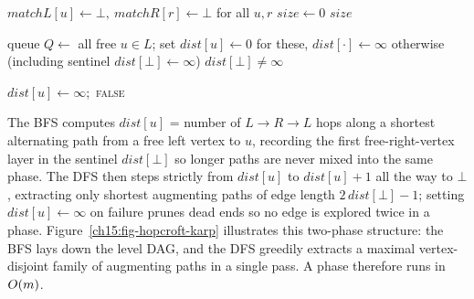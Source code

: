 \begin{algorithm}[H]
\caption{\textsc{HopcroftKarp}$(L,R,E)$}
\label{ch15:alg-hk}
\DontPrintSemicolon
$\mathit{matchL}[u]\gets\bot,\ \mathit{matchR}[r]\gets\bot$ for all $u,r$\;
$\mathit{size}\gets 0$\;
\Return $\mathit{size}$\;
\end{algorithm}

\begin{algorithm}[H]
\caption{\textsc{BFS}() -- build layers, return whether any augmenting path exists}
\label{ch15:alg-hk-bfs}
\DontPrintSemicolon
queue $Q\gets$ all free $u\in L$; set $\mathit{dist}[u]\gets 0$ for these,
$\mathit{dist}[\cdot]\gets\infty$ otherwise (including sentinel $\mathit{dist}[\bot]\gets\infty$)\;
\Return $\mathit{dist}[\bot]\neq\infty$\;
\end{algorithm}

\begin{algorithm}[H]
\caption{\textsc{DFS}$(u)$ -- extract one shortest augmenting path from $u$}
\label{ch15:alg-hk-dfs}
\DontPrintSemicolon
{}
$\mathit{dist}[u]\gets\infty$;\ \Return \textsc{false}\;
\end{algorithm}

The BFS computes $\mathit{dist}[u]$ = number of $L\to R\to L$ hops along a
shortest alternating path from a free left vertex to $u$, recording the first
free-right-vertex layer in the sentinel $\mathit{dist}[\bot]$ so longer paths are
never mixed into the same phase. The DFS then steps strictly from $\mathit{dist}[u]$
to $\mathit{dist}[u]+1$ all the way to $\bot$, extracting only shortest augmenting
paths of edge length $2\,\mathit{dist}[\bot]-1$; setting $\mathit{dist}[u]\gets\infty$ on failure
prunes dead ends so no edge is explored twice in a phase. Figure~\ref{ch15:fig-hopcroft-karp}
illustrates this two-phase structure: the BFS lays down the level DAG, and the DFS
greedily extracts a maximal vertex-disjoint family of augmenting paths in a single pass.
A phase therefore runs in $O(m)$.

